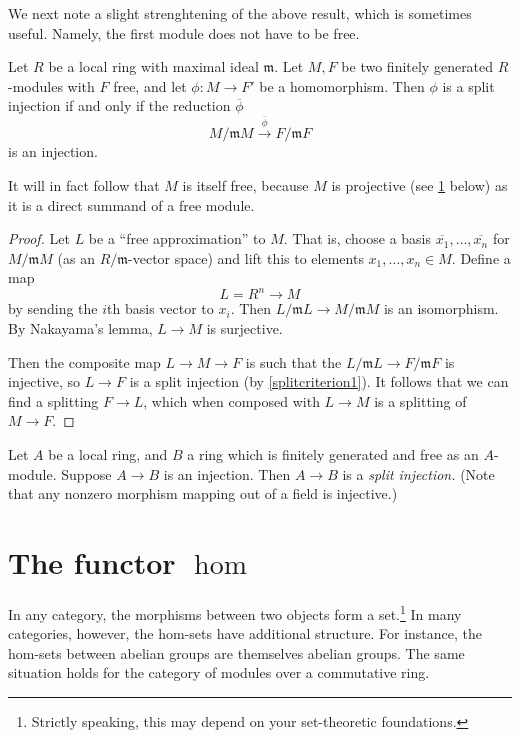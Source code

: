 We next note  a slight strenghtening of the above result, which is sometimes
useful. Namely, the first module does not have to be free.
\begin{proposition} 
Let $R$ be a local ring with maximal ideal $\mathfrak{m}$. Let $M, F$ be two
finitely generated $R$-modules with $F$ free, and let $\phi: M \to F'$ be a homomorphism. 
Then $\phi$ is a split injection if and only if the reduction $\overline{\phi}$
\[ M/\mathfrak{m}M \stackrel{\overline{\phi}}{\to} F/\mathfrak{m}F  \]
is an injection. 
\end{proposition}
It will in fact follow that $M$ is itself free, because $M$ is projective (see
\cref{} below) as it is a direct summand of a free module.
\begin{proof} 
Let $L$ be a ``free approximation'' to $M$.
That is, choose a basis $\overline{x_1}, \dots, \overline{x_n}$ for $M/\mathfrak{m}M$ (as an $R/\mathfrak{m}$-vector
space) and lift this to elements $x_1, \dots, x_n \in M$. Define a map
\[ L = R^n \to M  \]
by sending the $i$th basis vector to $x_i$.
Then $L/\mathfrak{m} L \to M/\mathfrak{m}M$ is an isomorphism.
By Nakayama's lemma,
$L \to M$ is surjective.

Then the composite map
$L \to M \to F$ is such that the $L/\mathfrak{m}L \to F/\mathfrak{m}F$ is injective, so
$L \to F$ is a split injection (by \cref{splitcriterion1}).
It follows that we can find a splitting $F \to L$, which when composed with $L
\to M$ is a splitting of $M \to F$.
\end{proof} 

\begin{exercise} 
Let $A$ be a local ring, and $B$ a ring which is finitely generated and free as an
$A$-module. Suppose $A \to B$ is an injection. Then $A \to B$ is a \emph{split
injection.} (Note that any nonzero morphism mapping out of a field is
injective.) 
\end{exercise} 

\section{The functor $\hom$}

In any category, the morphisms between two objects form a
set.\footnote{Strictly speaking, this may depend on your set-theoretic
foundations.} In many
categories, however, the hom-sets have additional structure. For instance,
the hom-sets
between abelian groups are themselves abelian groups. The same situation holds
for the category of modules over a commutative ring.


